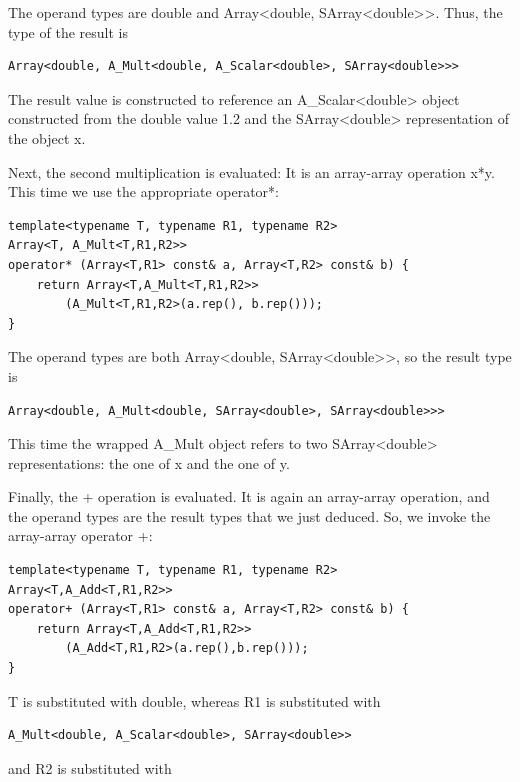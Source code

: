 The operand types are double and Array<double, SArray<double>>. Thus, the type of the result is

\begin{lstlisting}[style=styleCXX]
Array<double, A_Mult<double, A_Scalar<double>, SArray<double>>>
\end{lstlisting}

The result value is constructed to reference an A\_Scalar<double> object constructed from the double value 1.2 and the SArray<double> representation of the object x.

Next, the second multiplication is evaluated: It is an array-array operation x*y. This time we use the appropriate operator*:

\begin{lstlisting}[style=styleCXX]
template<typename T, typename R1, typename R2>
Array<T, A_Mult<T,R1,R2>>
operator* (Array<T,R1> const& a, Array<T,R2> const& b) {
	return Array<T,A_Mult<T,R1,R2>>
		(A_Mult<T,R1,R2>(a.rep(), b.rep()));
}
\end{lstlisting}

The operand types are both Array<double, SArray<double>>, so the result type is

\begin{lstlisting}[style=styleCXX]
Array<double, A_Mult<double, SArray<double>, SArray<double>>>
\end{lstlisting}

This time the wrapped A\_Mult object refers to two SArray<double> representations: the one of x and the one of y.

Finally, the + operation is evaluated. It is again an array-array operation, and the operand types are the result types that we just deduced. So, we invoke the array-array operator +:

\begin{lstlisting}[style=styleCXX]
template<typename T, typename R1, typename R2>
Array<T,A_Add<T,R1,R2>>
operator+ (Array<T,R1> const& a, Array<T,R2> const& b) {
	return Array<T,A_Add<T,R1,R2>>
		(A_Add<T,R1,R2>(a.rep(),b.rep()));
}
\end{lstlisting}

T is substituted with double, whereas R1 is substituted with

\begin{lstlisting}[style=styleCXX]
A_Mult<double, A_Scalar<double>, SArray<double>>
\end{lstlisting}

and R2 is substituted with


